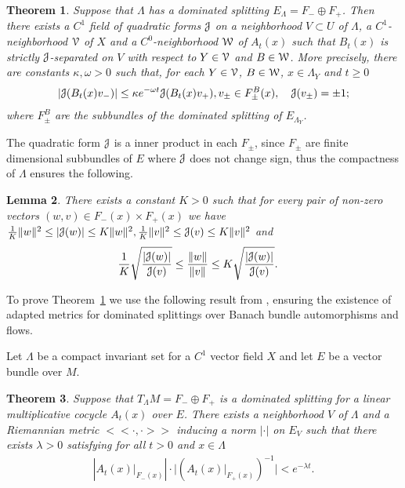 \documentclass[12pt,reqno]{amsart}
\numberwithin{equation}{section}
\newcommand{\qand}{\quad\text{and}\quad}
\theoremstyle{plain}
\newtheorem{theorem}{Theorem}[section]
\newtheorem{lemma}[theorem]{Lemma}
\theoremstyle{definition}
\newcommand{\V}{\EuScript{V}}
\newcommand{\J}{\EuScript{J}}
\newcommand{\W}{\EuScript{W}}
\begin{document}
\begin{theorem}
  \label{thm:necessity}
  Suppose that $\Lambda$ has a dominated splitting
  $E_\Lambda=F_-\oplus F_+$. Then there exists a $C^1$
  field of quadratic forms $\J$ on a neighborhood
  $V\subset U$ of $\Lambda$, a $C^1$-neighborhood $\V$
  of $X$ and a $C^0$-neighborhood $\W$ of $A_t(x)$ such
  that $B_t(x)$ is strictly $\J$-separated on $V$ with
  respect to $Y\in\V$ and $B\in\W$. More
    precisely, there are constants $\kappa,\omega>0$
    such that, for each $Y\in\V$, $B\in\W$,
    $x\in\Lambda_Y$ and $t\ge0$
    \begin{align*}
      |\J(B_t(x)v_-)|\le \kappa e^{-\omega
        t}\J(B_t(x)v_+) ,  v_\pm\in F^B_\pm(x),
      \quad
      \J(v_\pm)=\pm1;
    \end{align*}
    where $F^B_\pm$ are the subbundles of the dominated
    splitting of $E_{\Lambda_Y}$.
\end{theorem}

The quadratic form $\J$ is a inner product in each $F_\pm$,
since $F_\pm$ are finite dimensional subbundles of $E$
where $\J$ does not change sign, thus
the compactness of $\Lambda$ ensures
 the following.

\begin{lemma}\label{le:ratio}
  There exists a constant $K>0$ such that for every
  pair of non-zero vectors $(w,v)\in F_-(x)\times
  F_+(x)$ we have $ \frac1K\|w\|^2 \le |\J(w)| \le
  K\|w\|^2, \frac1K\|v\|^2 \le \J(v) \le K\|v\|^2$ and
    \begin{align*}
    \frac1K
    \sqrt{\frac{|\J(w)|}{\J(v)}}
    &\le
    \frac{\| w\|}{\| v\|}
    \le K  \sqrt{\frac{|\J(w)|}{\J(v)}}.
  \end{align*}
\end{lemma}

To prove Theorem~\ref{thm:necessity} we use the
following result from \cite{Goum07}, ensuring the
existence of adapted metrics for dominated splittings
over Banach bundle automorphisms and flows.

Let $\Lambda$ be a compact invariant set for a $C^1$ vector
field $X$ and let $E$ be a vector bundle over $M$.
\begin{theorem}
  \label{thm:phyp-adapted-metric}
  Suppose that $T_{\Lambda}M = F_-\oplus F_+$ is a dominated
  splitting for a linear multiplicative cocycle $A_t(x)$
  over $E$.
  There exists a neighborhood $V$ of $\Lambda$ and a
  Riemannian metric $<<\cdot,\cdot>>$ inducing a norm
  $|\cdot|$ on $E_V$ such that there exists $\lambda>0$
  satisfying for all $t>0$ and $x\in\Lambda$
  \begin{align*}
    |A_t(x)\vert_{F_-(x)}|\cdot\big|(A_t(x)\vert_{F_+(x)})^{-1}|
    <e^{-\lambda t}.
  \end{align*}
\end{theorem}
\end{document}
